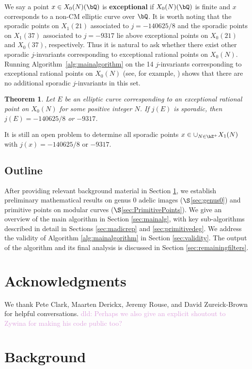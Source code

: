 \documentclass[11pt,reqno]{amsart}
\theoremstyle{plain}
\newtheorem{theorem}{Theorem}%
\theoremstyle{definition}
\newcommand{\Q}{\bQ}
\newcommand{\Z}{\bZ}
\newcommand{\dld}[1]{\textcolor{Plum}{dld: #1}}
\newcommand{\abedit}[1]{{\color{blue} #1}}
\begin{document}
We say a point $x \in X_0(N)(\Q)$ is \textbf{exceptional} if $X_0(N)(\Q)$ is finite and $x$ corresponds to a non-CM elliptic curve over $\Q$. It is worth noting that the sporadic points on $X_1(21)$ associated to $j=-140625/8$ and the sporadic points on $X_1(37)$ associated to $j=-9317$ lie above exceptional points on $X_0(21)$ and $X_0(37)$, respectively. Thus it is natural to ask whether there exist other sporadic \abedit{$j$-invariants corresponding to} exceptional rational points on $X_0(N)$. Running Algorithm~\ref{alg:mainalgorithm} on the 14 $j$-invariants corresponding to exceptional rational points on $X_0(N)$ (see, for example, \cite[Table 4]{LRAnn}) shows that there are no additional sporadic $j$-invariants in this set.
\begin{theorem}
Let $E$ be an elliptic curve corresponding to an exceptional rational point on $X_0(N)$ for some positive integer $N$. \abedit{If $j(E)$ is sporadic, then $j(E)=-140625/8$ or $-9317$.}
\end{theorem}

It is still an open problem to determine all sporadic points $x \in \cup_{N \in \Z^+} X_1(N)$ with $j(x) =-140625/8$ or $-9317$.

\subsection{Outline}
After providing relevant background material in Section \ref{sec:background}, we establish  preliminary mathematical results on genus 0 adelic images ($\S$\ref{sec:genus0}) and primitive points on modular curves ($\S$\ref{sec:PrimitivePoints}). We give an overview of the main algorithm in Section \ref{sec:mainalg}, with key sub-algorithms described in detail in Sections \ref{sec:madicrep} and \ref{sec:primitivedeg}. We address the validity of Algorithm \ref{alg:mainalgorithm} in Section \ref{sec:validity}. The output of the algorithm and its final analysis is discussed in Section \ref{sec:remainingfilters}.

\section*{Acknowledgments}
We thank Pete Clark, Maarten Derickx, Jeremy Rouse, and David Zureick-Brown for helpful conversations.
\dld{Perhaps we also give an explicit shoutout to Zywina for making his code public too?}

\section{Background}
\label{sec:background}
\end{document}
